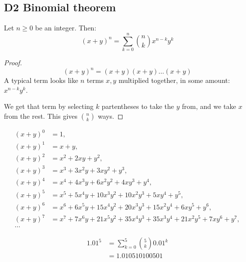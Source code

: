 \documentclass[12pt]{article}
\begin{document}
\subsection{D2 Binomial theorem}
\begin{theorem}
    Let $n\geq 0$ be an integer. Then: \[(x+y)^n=\sum_{k=0}^{n}\binom{n}{k}x^{n-k}y^k\]
\end{theorem}
\begin{proof}
    \[(x+y)^n = (x+y)(x+y)\dots (x+y)\]
    A typical term looks like $n$ terms $x,y$ multiplied together, in some amount: $x^{n-k}y^k$.

    We get that term by selecting $k$ partentheses to take the $y$ from, and we take $x$ from the rest. This gives $n\choose k$ ways.
\end{proof}
\eg \[\begin{aligned}(x+y)^{0}&=1,\\[8pt](x+y)^{1}&=x+y,\\[8pt](x+y)^{2}&=x^{2}+2xy+y^{2},\\[8pt](x+y)^{3}&=x^{3}+3x^{2}y+3xy^{2}+y^{3},\\[8pt](x+y)^{4}&=x^{4}+4x^{3}y+6x^{2}y^{2}+4xy^{3}+y^{4},\\[8pt](x+y)^{5}&=x^{5}+5x^{4}y+10x^{3}y^{2}+10x^{2}y^{3}+5xy^{4}+y^{5},\\[8pt](x+y)^{6}&=x^{6}+6x^{5}y+15x^{4}y^{2}+20x^{3}y^{3}+15x^{2}y^{4}+6xy^{5}+y^{6},\\[8pt](x+y)^{7}&=x^{7}+7x^{6}y+21x^{5}y^{2}+35x^{4}y^{3}+35x^{3}y^{4}+21x^{2}y^{5}+7xy^{6}+y^{7},\\[8pt]\dots \end{aligned}\]

\eg \begin{align*}
    1.01^5&= \sum_{k=0}^{5}\binom{5}{k}0.01^k\\
    &= 1.010510100501
\end{align*}
\end{document}

